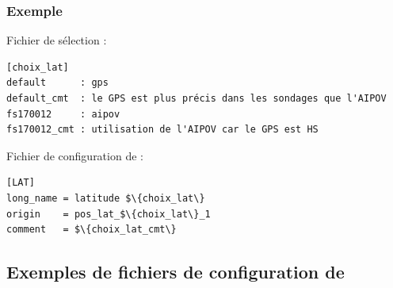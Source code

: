 \subsubsection{Exemple}

Fichier de sélection :
\begin{Verbatim}[fontsize=\myfontsize, commandchars=\\\{\}]
[choix_lat]
default      : gps
default_cmt  : le GPS est plus précis dans les sondages que l'AIPOV
fs170012     : aipov
fs170012_cmt : utilisation de l'AIPOV car le GPS est HS
\end{Verbatim}

Fichier de configuration de \prodcdf :
\begin{Verbatim}[fontsize=\myfontsize, commandchars=\\\{\}]
[LAT]
long_name = latitude $\{choix_lat\}
origin    = pos_lat_$\{choix_lat\}_1
comment   = $\{choix_lat_cmt\}
\end{Verbatim}


\subsection{Exemples de fichiers de configuration de \prodcdf}

